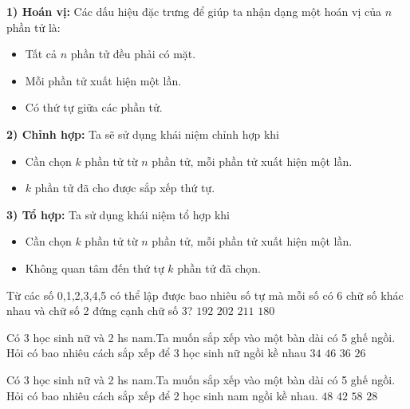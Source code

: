 \textbf{1) Hoán vị:} Các dấu hiệu đặc trưng để giúp ta nhận dạng một hoán vị của $n$ phần tử là:
\begin{itemize}
	\item Tất cả $n$ phần tử đều phải có mặt.
	\item Mỗi phần tử xuất hiện một lần.
	\item Có thứ tự giữa các phần tử.
\end{itemize}

\textbf{2) Chỉnh hợp:} Ta sẽ sử dụng khái niệm chỉnh hợp khi
\begin{itemize}
	\item Cần chọn $k$ phần tử từ $n$ phần tử, mỗi phần tử xuất hiện một lần.
	\item $k$ phần tử đã cho được sắp xếp thứ tự.
\end{itemize}

\textbf{3) Tổ hợp:} Ta sử dụng khái niệm tổ hợp khi
\begin{itemize}
	\item Cần chọn $k$ phần tử từ $n$ phần tử, mỗi phần tử xuất hiện một lần.
	\item Không quan tâm đến thứ tự $k$ phần tử đã chọn.
\end{itemize}

\begin{ex}
	Từ các số 0,1,2,3,4,5 có thể lập được bao nhiêu số tự mà mỗi số có 6 chữ số khác nhau và chữ số 2 đứng cạnh chữ số 3?
	\choice
	{\True $192$}
	{$202$}
	{$211$}
	{$180$}
\end{ex}

\begin{ex}
	Có 3 học sinh nữ và 2 hs nam.Ta muốn sắp xếp vào một bàn dài có 5 ghế ngồi. Hỏi có bao nhiêu cách sắp xếp để 3 học sinh nữ ngồi kề nhau
	\choice
	{$34$}
	{$46$}
	{\True $36$}
	{$26$}
\end{ex}

\begin{ex}
	Có 3 học sinh nữ và 2 hs nam.Ta muốn sắp xếp vào một bàn dài có 5 ghế ngồi. Hỏi có bao nhiêu cách sắp xếp để 2 học sinh nam ngồi kề nhau.
	\choice
	{\True $48$}
	{$42$}
	{$58$}
	{$28$}
\end{ex}

